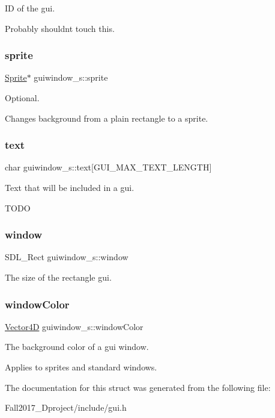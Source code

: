 ID of the gui. 

Probably shouldn\textquotesingle{}t touch this. \mbox{\label{structguiwindow__s_a44df1a42aae23bae63ec9a7a9243b80e}} 
\subsubsection{\texorpdfstring{sprite}{sprite}}
{\footnotesize\ttfamily \hyperlink{struct_sprite___s}{Sprite}$\ast$ guiwindow\+\_\+s\+::sprite}



Optional. 

Changes background from a plain rectangle to a sprite. \mbox{\label{structguiwindow__s_ae89913af12503b162dd7fbb8b5969d55}} 
\subsubsection{\texorpdfstring{text}{text}}
{\footnotesize\ttfamily char guiwindow\+\_\+s\+::text\mbox{[}G\+U\+I\+\_\+\+M\+A\+X\+\_\+\+T\+E\+X\+T\+\_\+\+L\+E\+N\+G\+TH\mbox{]}}



Text that will be included in a gui. 

T\+O\+DO \mbox{\label{structguiwindow__s_a4f1cb1337e6c6ea0924a54bbc411a1ce}} 
\subsubsection{\texorpdfstring{window}{window}}
{\footnotesize\ttfamily S\+D\+L\+\_\+\+Rect guiwindow\+\_\+s\+::window}



The size of the rectangle gui. 

\mbox{\label{structguiwindow__s_aea6170e71a582fa8ea892ae629b9f3fb}} 
\subsubsection{\texorpdfstring{window\+Color}{windowColor}}
{\footnotesize\ttfamily \hyperlink{struct_vector4_d}{Vector4D} guiwindow\+\_\+s\+::window\+Color}



The background color of a gui window. 

Applies to sprites and standard windows. 

The documentation for this struct was generated from the following file\+:\begin{DoxyCompactItemize}
\item 
Fall2017\+\_\+Dproject/include/gui.\+h\end{DoxyCompactItemize}
